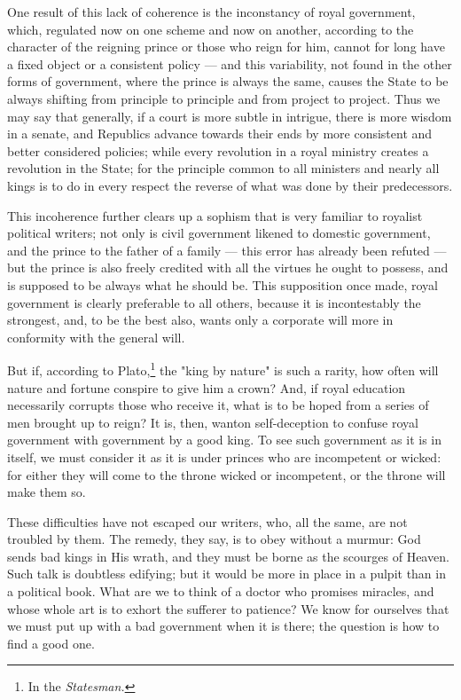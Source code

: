 \documentclass[12pt]{book}
\begin{document}
One result of this lack of coherence is the inconstancy of royal government, which, regulated now on one scheme and now on another, according to the character of the reigning prince or those who reign for him, cannot for long have a fixed object or a consistent policy — and this variability, not found in the other forms of government, where the prince is always the same, causes the State to be always shifting from principle to principle and from project to project. Thus we may say that generally, if a court is more subtle in intrigue, there is more wisdom in a senate, and Republics advance towards their ends by more consistent and better considered policies; while every revolution in a royal ministry creates a revolution in the State; for the principle common to all ministers and nearly all kings is to do in every respect the reverse of what was done by their predecessors.

This incoherence further clears up a sophism that is very familiar to royalist political writers; not only is civil government likened to domestic government, and the prince to the father of a family — this error has already been refuted — but the prince is also freely credited with all the virtues he ought to possess, and is supposed to be always what he should be. This supposition once made, royal government is clearly preferable to all others, because it is incontestably the strongest, and, to be the best also, wants only a corporate will more in conformity with the general will.

But if, according to Plato,\footnote{In the \textit{Statesman.}} the "king by nature" is such a rarity, how often will nature and fortune conspire to give him a crown? And, if royal education necessarily corrupts those who receive it, what is to be hoped from a series of men brought up to reign? It is, then, wanton self-deception to confuse royal government with government by a good king. To see such government as it is in itself, we must consider it as it is under princes who are incompetent or wicked: for either they will come to the throne wicked or incompetent, or the throne will make them so.

These difficulties have not escaped our writers, who, all the same, are not troubled by them. The remedy, they say, is to obey without a murmur: God sends bad kings in His wrath, and they must be borne as the scourges of Heaven. Such talk is doubtless edifying; but it would be more in place in a pulpit than in a political book. What are we to think of a doctor who promises miracles, and whose whole art is to exhort the sufferer to patience? We know for ourselves that we must put up with a bad government when it is there; the question is how to find a good one.
\end{document}
